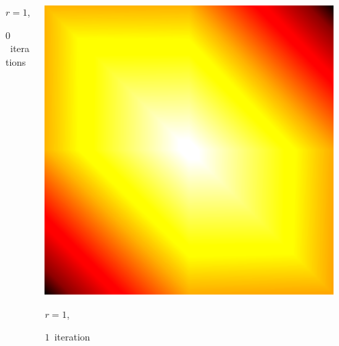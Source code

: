 \documentclass[aspectratio=169,t]{beamer}
\begin{document}
{\begin{columns}
\begin{column}{0.22\textwidth}
			{\footnotesize
				\par \vspace{-1mm} $r=1$,
				\par \vspace{-1mm} $0$~iterations
			}
		\end{column}
		\begin{column}{0.22\textwidth}
			\centering
			\includegraphics[width=.85\textwidth]{data/synthetic_meshes/square_tesselation_2tri_Dirac_delta_1_v9_f8_funcvals_1iter_crop.png}
			{\footnotesize
				\par \vspace{-1mm} $r=1$,
				\par \vspace{-1mm} $1$~iteration
			}
		\end{column}
		\begin{column}{0.17\textwidth}~\end{column}
	\end{columns}
	\vspace*{4mm}
	\begin{columns}
		\begin{column}{0.17\textwidth}~\end{column}
		\begin{column}{0.22\textwidth}
			\centering

\end{column}
\end{columns}}
\end{document}
